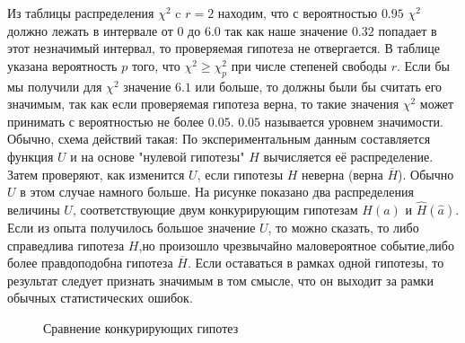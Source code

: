 \documentclass[russian, 12pt, fleqn,x11names]{article}
\begin{document}
Из таблицы распределения $\chi^2$ c $r=2$ находим, что с вероятностью $0.95$ $\chi^2$ должно лежать в интервале от $0$ до $6.0$ так  как наше значение  $0.32$ попадает в этот незначимый интервал, то проверяемая гипотеза не отвергается.
В таблице указана вероятность $p$ того, что $\chi^2 \geq \chi^2_p$ при  числе степеней свободы $r$.
Если бы мы получили для $\chi^2$ значение $6.1$ или больше, то должны были бы считать  его значимым, так как если проверяемая гипотеза верна, то такие значения $\chi^2$ может принимать с вероятностью не более $0.05$. $0.05$ называется уровнем значимости.
Обычно, схема действий такая: По экспериментальным данным составляется функция $U$ и на основе "нулевой гипотезы" $H$ вычисляется её распределение. Затем проверяют, как изменится $U$, если гипотезы $H$ неверна (верна $\overline{H}$).
Обычно $U$ в этом случае намного больше. На рисунке показано два распределения величины $U$, соответствующие двум конкурирующим гипотезам $H(a)$ и $\hat{H}(\hat{a})$. Если из опыта получилось большое значение $U$, то можно сказать, то либо справедлива гипотеза $H$,но произошло чрезвычайно маловероятное событие,либо более правдоподобна гипотеза $\overline{H}$. Если оставаться в рамках одной гипотезы, то результат следует признать значимым в том смысле, что он выходит за рамки обычных статистических ошибок.\\
\newpage
\begin{figure}[!h]
\caption{Сравнение конкурирующих гипотез}
\end{figure}
\end{document}
